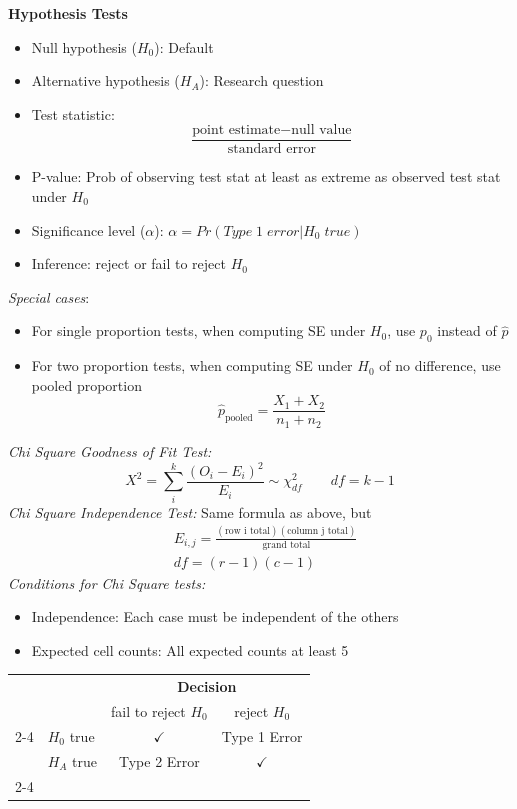 \textbf{Hypothesis Tests}

\begin{itemize}
    \item Null hypothesis ($H_0$): Default
    \item Alternative hypothesis ($H_A$): Research question
    \item Test statistic: \[\frac{\text{point estimate} - \text{null value}}{\text{standard error}}\]
    \item P-value: Prob of observing test stat at least as extreme as observed test stat under $H_0$
    \item Significance level ($\alpha$): $\alpha=Pr(Type\; 1\; error | H_0\; true)$
    \item Inference: reject or fail to reject $H_0$
\end{itemize}

\textit{Special cases}:
\begin{itemize}
    \item For single proportion tests, when computing SE under $H_0$, use $p_0$ instead of $\hat{p}$
    \item For two proportion tests, when computing SE under $H_0$ of no difference, use pooled proportion \[\hat{p}_{\text{pooled}} = \frac{X_1 + X_2}{n_1 + n_2}\]
\end{itemize}

\textit{Chi Square Goodness of Fit Test:}
\[
    X^2 = \sum_i^k \frac{(O_i - E_i)^2}{E_i} \sim \chi^2_{df} \qquad
    df = k - 1 
\]
\textit{Chi Square Independence Test:}
Same formula as above, but
\begin{align*}
    & E_{i,j} = \frac{(\text{row i total})(\text{column j total})}{\text{grand total}} \\
    & df = (r - 1)(c - 1) 
\end{align*}
\textit{Conditions for Chi Square tests:}
\begin{itemize} 
    \item Independence: Each case must be independent of the others
    \item Expected cell counts: All expected counts at least 5
\end{itemize}  


\begin{center}
\begin{tabular}{l l | c c}
\multicolumn{2}{c}{} & \multicolumn{2}{c}{\textbf{Decision}} \\
& & fail to reject $H_0$ &  reject $H_0$ \\
  \cline{2-4}
& $H_0$ true & $\checkmark$ &  Type 1 Error \\
\raisebox{1.5ex}{\textbf{Truth}} & $H_A$ true & Type 2 Error & $\checkmark$ \\
  \cline{2-4}
\end{tabular}
\end{center}